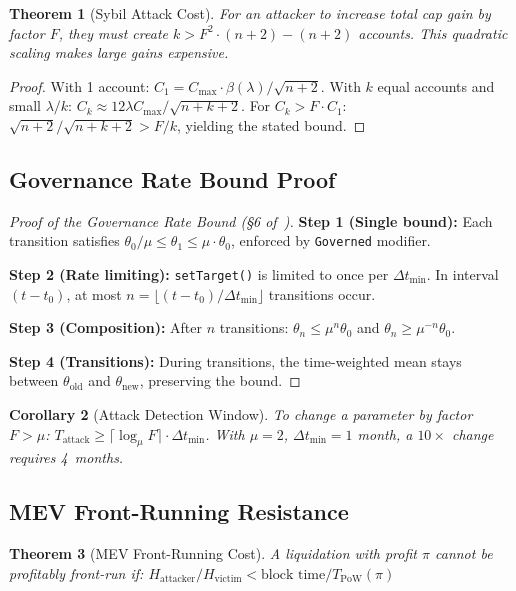 \documentclass[10pt,a4paper,twocolumn]{article}
\theoremstyle{definition}
\theoremstyle{plain}
\newtheorem{theorem}{Theorem}[section]
\newtheorem{corollary}[theorem]{Corollary}
\theoremstyle{remark}
\begin{document}
\begin{theorem}[Sybil Attack Cost]
\label{thm:sybil-cost}
For an attacker to increase total cap gain by factor $F$, they must create $k > F^2 \cdot (n{+}2) - (n{+}2)$ accounts. This quadratic scaling makes large gains expensive.
\end{theorem}

\begin{proof}
With 1 account: $C_1 = C_{\max} \cdot \beta(\lambda) / \sqrt{n{+}2}$. With $k$ equal accounts and small $\lambda/k$: $C_k \approx 12\lambda C_{\max}/\sqrt{n{+}k{+}2}$. For $C_k > F \cdot C_1$: $\sqrt{n{+}2}/\sqrt{n{+}k{+}2} > F/k$, yielding the stated bound.
\end{proof}

\subsection{Governance Rate Bound Proof}

\begin{proof}[Proof of the Governance Rate Bound (\S6 of~\cite{wp})]
\textbf{Step 1 (Single bound):} Each transition satisfies $\theta_0/\mu \leq \theta_1 \leq \mu \cdot \theta_0$, enforced by \texttt{Governed} modifier.

\textbf{Step 2 (Rate limiting):} \texttt{setTarget()} is limited to once per $\Delta t_{\min}$. In interval $(t{-}t_0)$, at most $n = \lfloor(t{-}t_0)/\Delta t_{\min}\rfloor$ transitions occur.

\textbf{Step 3 (Composition):} After $n$ transitions: $\theta_n \leq \mu^n \theta_0$ and $\theta_n \geq \mu^{-n} \theta_0$.

\textbf{Step 4 (Transitions):} During transitions, the time-weighted mean stays between $\theta_{\text{old}}$ and $\theta_{\text{new}}$, preserving the bound.
\end{proof}

\begin{corollary}[Attack Detection Window]
To change a parameter by factor $F > \mu$: $T_{\text{attack}} \geq \lceil\log_\mu F\rceil \cdot \Delta t_{\min}$. With $\mu = 2$, $\Delta t_{\min} = 1$ month, a $10\times$ change requires 4~months.
\end{corollary}

\subsection{MEV Front-Running Resistance}

\begin{theorem}[MEV Front-Running Cost]
\label{thm:mev}
A liquidation with profit $\pi$ cannot be profitably front-run if:
$H_{\text{attacker}}/H_{\text{victim}} < \text{block time}/T_{\text{PoW}}(\pi)$
\end{theorem}
\end{document}
